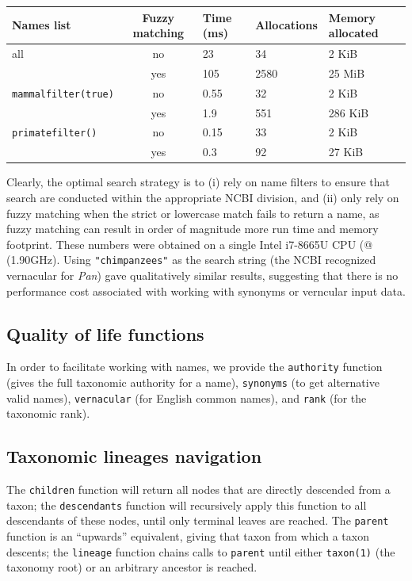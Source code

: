 \documentclass[10pt,oneside]{article}
\begin{document}
\begin{longtable}[]{@{}lclll@{}}
\toprule
Names list & Fuzzy matching & Time (ms) & Allocations & Memory
allocated\tabularnewline
\midrule
\endhead
all & no & 23 & 34 & 2 KiB\tabularnewline
& yes & 105 & 2580 & 25 MiB\tabularnewline
\texttt{mammalfilter(true)} & no & 0.55 & 32 & 2 KiB\tabularnewline
& yes & 1.9 & 551 & 286 KiB\tabularnewline
\texttt{primatefilter()} & no & 0.15 & 33 & 2 KiB\tabularnewline
& yes & 0.3 & 92 & 27 KiB\tabularnewline
\bottomrule
\end{longtable}

Clearly, the optimal search strategy is to (i) rely on name filters to
ensure that search are conducted within the appropriate NCBI division,
and (ii) only rely on fuzzy matching when the strict or lowercase match
fails to return a name, as fuzzy matching can result in order of
magnitude more run time and memory footprint. These numbers were
obtained on a single Intel i7-8665U CPU (@ (1.90GHz). Using
\texttt{"chimpanzees"} as the search string (the NCBI recognized
vernacular for \emph{Pan}) gave qualitatively similar results,
suggesting that there is no performance cost associated with working
with synonyms or verncular input data.

\hypertarget{quality-of-life-functions}{%
\subsection{Quality of life functions}\label{quality-of-life-functions}}

In order to facilitate working with names, we provide the
\texttt{authority} function (gives the full taxonomic authority for a
name), \texttt{synonyms} (to get alternative valid names),
\texttt{vernacular} (for English common names), and \texttt{rank} (for
the taxonomic rank).

\hypertarget{taxonomic-lineages-navigation}{%
\subsection{Taxonomic lineages
navigation}\label{taxonomic-lineages-navigation}}

The \texttt{children} function will return all nodes that are directly
descended from a taxon; the \texttt{descendants} function will
recursively apply this function to all descendants of these nodes, until
only terminal leaves are reached. The \texttt{parent} function is an
``upwards'' equivalent, giving that taxon from which a taxon descents;
the \texttt{lineage} function chains calls to \texttt{parent} until
either \texttt{taxon(1)} (the taxonomy root) or an arbitrary ancestor is
reached.
\end{document}
